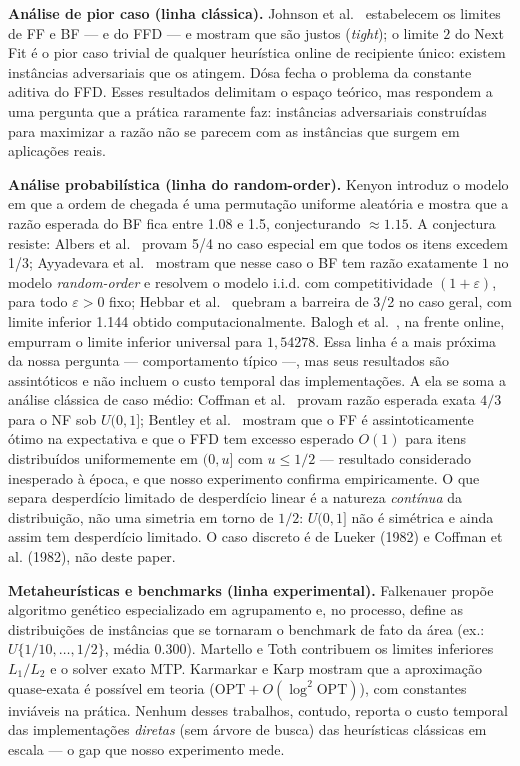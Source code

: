 \documentclass[12pt]{article}
\begin{document}
\textbf{Análise de pior caso (linha clássica).} Johnson et al.~\cite{johnson1974} estabelecem os limites de FF e BF --- e do FFD --- e mostram que são justos (\textit{tight}); o limite $2$ do Next Fit é o pior caso trivial de qualquer heurística online de recipiente único: existem instâncias adversariais que os atingem. Dósa \cite{dosa2007,dosa2013} fecha o problema da constante aditiva do FFD. Esses resultados delimitam o espaço teórico, mas respondem a uma pergunta que a prática raramente faz: instâncias adversariais construídas para maximizar a razão não se parecem com as instâncias que surgem em aplicações reais.

\textbf{Análise probabilística (linha do random-order).} Kenyon \cite{kenyon1996} introduz o modelo em que a ordem de chegada é uma permutação uniforme aleatória e mostra que a razão esperada do BF fica entre 1.08 e 1.5, conjecturando $\approx 1.15$. A conjectura resiste: Albers et al.~\cite{albers2021} provam 5/4 no caso especial em que todos os itens excedem 1/3; Ayyadevara et al.~\cite{ayyadevara2025} mostram que nesse caso o BF tem razão exatamente $1$ no modelo \emph{random-order} e resolvem o modelo i.i.d. com competitividade $(1+\varepsilon)$, para todo $\varepsilon > 0$ fixo; Hebbar et al.~\cite{hebbar2024} quebram a barreira de 3/2 no caso geral, com limite inferior 1.144 obtido computacionalmente. Balogh et al.~\cite{balogh2021}, na frente online, empurram o limite inferior universal para $1{,}54278$. Essa linha é a mais próxima da nossa pergunta --- comportamento típico ---, mas seus resultados são assintóticos e não incluem o custo temporal das implementações. A ela se soma a análise clássica de caso médio: Coffman et al.~\cite{coffman1980} provam razão esperada exata $4/3$ para o NF sob $U(0,1]$; Bentley et al.~\cite{bentley1984} mostram que o FF é assintoticamente ótimo na expectativa e que o FFD tem excesso esperado $O(1)$ para itens distribuídos uniformemente em $(0,u]$ com $u \leq 1/2$ --- resultado considerado inesperado à época, e que nosso experimento confirma empiricamente. O que separa desperdício limitado de desperdício linear é a natureza \emph{contínua} da distribuição, não uma simetria em torno de $1/2$: $U(0,1]$ não é simétrica e ainda assim tem desperdício limitado. O caso discreto é de Lueker (1982) e Coffman et al. (1982), não deste paper.

\textbf{Metaheurísticas e benchmarks (linha experimental).} Falkenauer \cite{falkenauer1996} propõe algoritmo genético especializado em agrupamento e, no processo, define as distribuições de instâncias que se tornaram o benchmark de fato da área (ex.: $U\{1/10, \ldots, 1/2\}$, média 0.300). Martello e Toth \cite{martello1990} contribuem os limites inferiores $L_1/L_2$ e o solver exato MTP. Karmarkar e Karp \cite{karmarkar1982} mostram que a aproximação quase-exata é possível em teoria ($\mathrm{OPT}+O(\log^2 \mathrm{OPT})$), com constantes inviáveis na prática. Nenhum desses trabalhos, contudo, reporta o custo temporal das implementações \textit{diretas} (sem árvore de busca) das heurísticas clássicas em escala --- o gap que nosso experimento mede.
\end{document}
